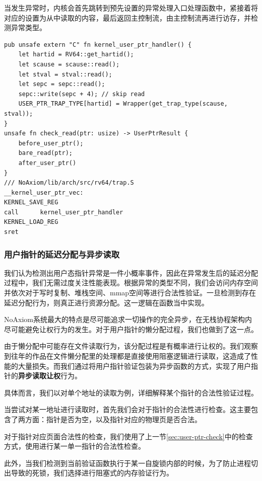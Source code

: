 \documentclass{article}
\begin{document}
当发生异常时，内核会首先跳转到预先设置的异常处理入口处理函数中，紧接着将对应的设置为从中读取的内容，最后返回主控制流，由主控制流再进行访存，并检测异常类型。

\begin{lstlisting}
pub unsafe extern "C" fn kernel_user_ptr_handler() {
    let hartid = RV64::get_hartid();
    let scause = scause::read();
    let stval = stval::read();
    let sepc = sepc::read();
    sepc::write(sepc + 4); // skip read
    USER_PTR_TRAP_TYPE[hartid] = Wrapper(get_trap_type(scause, stval));
}
unsafe fn check_read(ptr: usize) -> UserPtrResult {
    before_user_ptr();
    bare_read(ptr);
    after_user_ptr()
}
/// NoAxiom/lib/arch/src/rv64/trap.S
__kernel_user_ptr_vec:
KERNEL_SAVE_REG
call      kernel_user_ptr_handler
KERNEL_LOAD_REG
sret
\end{lstlisting}

\subsubsection{用户指针的延迟分配与异步读取}

我们认为检测出用户态指针异常是一件小概率事件，因此在异常发生后的延迟分配过程中，我们无需过度关注性能表现。根据异常的类型不同，我们会访问内存空间并依次对于写时复制、堆栈空间、mmap空间等进行合法性验证。一旦检测到存在延迟分配行为，则真正进行资源分配。这一逻辑在函数当中实现。

NoAxiom系统最大的特点是尽可能追求一切操作的完全异步，在无栈协程架构内尽可能避免让权行为的发生。对于用户指针的懒分配过程，我们也做到了这一点。

由于懒分配中可能存在文件读取行为，该分配过程是有概率进行让权的。我们观察到往年的作品在文件懒分配里的处理都是直接使用阻塞逻辑进行读取，这造成了性能的大量损失。而我们通过将用户指针验证包装为异步函数的方式，实现了用户指针的\textbf{异步读取让权}行为。

具体而言，我们以对单个地址的读取为例，详细解释某个指针的合法性验证过程。

当尝试对某一地址进行读取时，首先我们会对于指针的合法性进行检查。这主要包含了两方面：指针是否为空，以及指针对应的物理页是否合法。

对于指针对应页面合法性的检查，我们使用了上一节\ref{sec:user-ptr-check}中的检查方式，使用进行某一单一指针的合法性检查。

此外，当我们检测到当前验证函数执行于某一自旋锁内部的时候，为了防止进程切出导致的死锁，我们选择进行阻塞式的内存验证行为。
\end{document}
